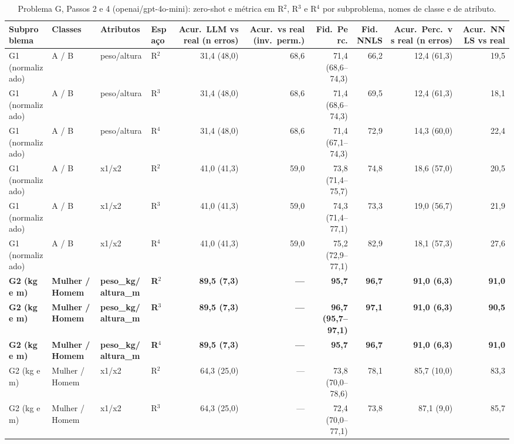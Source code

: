 \begin{table}[htbp]
\centering
\footnotesize
\caption{Problema G, Passos 2 e 4 (openai/gpt-4o-mini): zero-shot e métrica em R$^2$, R$^3$ e R$^4$ por subproblema, nomes de classe e de atributo.}
\label{tab:bloco3_G_passos_2_e_4_R2_R3_R4_gpt4mini}
\begin{tabular}{llllrrrrrr}
\toprule
Subproblema & Classes & Atributos & Espaço & Acur.\ LLM vs real (n erros) & Acur.\ vs real (inv.\ perm.) & Fid.\ Perc. & Fid.\ NNLS & Acur.\ Perc.\ vs real (n erros) & Acur.\ NNLS vs real \\
\midrule
G1 (normalizado) & A / B & peso/altura & R$^2$ & 31,4 (48,0) & 68,6 & 71,4 (68,6–74,3) & 66,2 & 12,4 (61,3) & 19,5 \\
G1 (normalizado) & A / B & peso/altura & R$^3$ & 31,4 (48,0) & 68,6 & 71,4 (68,6–74,3) & 69,5 & 12,4 (61,3) & 18,1 \\
G1 (normalizado) & A / B & peso/altura & R$^4$ & 31,4 (48,0) & 68,6 & 71,4 (67,1–74,3) & 72,9 & 14,3 (60,0) & 22,4 \\
\midrule
G1 (normalizado) & A / B & x1/x2 & R$^2$ & 41,0 (41,3) & 59,0 & 73,8 (71,4–75,7) & 74,8 & 18,6 (57,0) & 20,5 \\
G1 (normalizado) & A / B & x1/x2 & R$^3$ & 41,0 (41,3) & 59,0 & 74,3 (71,4–77,1) & 73,3 & 19,0 (56,7) & 21,9 \\
G1 (normalizado) & A / B & x1/x2 & R$^4$ & 41,0 (41,3) & 59,0 & 75,2 (72,9–77,1) & 82,9 & 18,1 (57,3) & 27,6 \\
\midrule
\textbf{G2 (kg e m)} & \textbf{Mulher / Homem} & \textbf{peso\_kg/altura\_m} & \textbf{R$^2$} & \textbf{89,5 (7,3)} & \textbf{—} & \textbf{95,7} & \textbf{96,7} & \textbf{91,0 (6,3)} & \textbf{91,0} \\
\textbf{G2 (kg e m)} & \textbf{Mulher / Homem} & \textbf{peso\_kg/altura\_m} & \textbf{R$^3$} & \textbf{89,5 (7,3)} & \textbf{—} & \textbf{96,7 (95,7–97,1)} & \textbf{97,1} & \textbf{91,0 (6,3)} & \textbf{90,5} \\
\textbf{G2 (kg e m)} & \textbf{Mulher / Homem} & \textbf{peso\_kg/altura\_m} & \textbf{R$^4$} & \textbf{89,5 (7,3)} & \textbf{—} & \textbf{95,7} & \textbf{96,7} & \textbf{91,0 (6,3)} & \textbf{91,0} \\
\midrule
G2 (kg e m) & Mulher / Homem & x1/x2 & R$^2$ & 64,3 (25,0) & — & 73,8 (70,0–78,6) & 78,1 & 85,7 (10,0) & 83,3 \\
G2 (kg e m) & Mulher / Homem & x1/x2 & R$^3$ & 64,3 (25,0) & — & 72,4 (70,0–77,1) & 73,8 & 87,1 (9,0) & 85,7 \\

\end{tabular}
\end{table}
